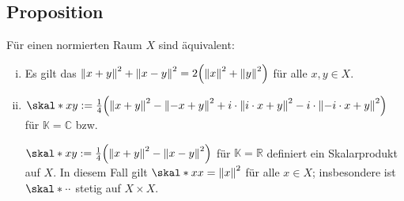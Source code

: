 \subsection[Proposition über Zusammenhang von Norm und Skalarprodukt mit dem Parallelogrammgesetz]{Proposition} %
\label{sub:77}
Für einen normierten Raum $X$ sind äquivalent: 
\begin{enumerate}[(i)]
	\item Es gilt das  $\norm{x+y}^2 + \norm{x-y}^2 = 2 \enbrace*{\norm{x}^2 + \norm{y}^2}$ für alle $x,y \in X$.
	\item $\skal*{x}{y} := \frac{1}{4} \enbrace*{\norm{x+y}^2 - \norm{-x+y}^2 + i \cdot \norm{i \cdot x +y}^2 - i \cdot \norm{-i \cdot x+ y}^2}$ für $\mathds{K}=\mathds{C}$ bzw.
	
	$\skal*{x}{y} := \frac{1}{4} \enbrace*{\norm{x+y}^2 - \norm{x-y}^2}$ für $\mathds{K}=\mathds{R}$ definiert ein Skalarprodukt auf $X$. In diesem Fall gilt
	$\skal*{x}{x} = \norm{x}^2$ für alle $x \in X$; insbesondere ist $\skal*{\cdot}{\cdot}$ stetig auf $X \times X$.
\end{enumerate}
